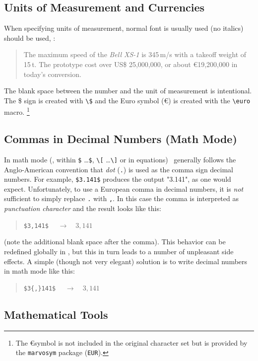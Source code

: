 \subsection{Units of Measurement and Currencies}

When specifying units of measurement, normal font is usually used (no italics) 
should be used, \eg:
%
\begin{quote}
	The maximum speed of the \textit{Bell XS-1} is 345\,m/s with a takeoff weight 
	of 15\,t. The prototype cost over US\$ 25,000,000, or about \euro 19,200,000
	in today's conversion.
\end{quote}
%
The blank space between the number and the unit of measurement is intentional.
The \$ sign is created with \verb!\$! and the Euro symbol (\euro) is created
with the \verb!\euro! macro.%
\footnote{The \euro symbol is not included in the original \latex character 
set but is provided by the \texttt{marvosym} package (\texttt{{\bs}EUR}).}


\subsection{Commas in Decimal Numbers (Math Mode)}


In math mode (\ie, within \verb!$! \ldots \verb!$!, \verb!\[! \ldots \verb!\]! or 
in equations) \latex\ generally follows the Anglo-American convention that 
\emph{dot} (\verb!.!) is used as the comma sign decimal numbers.
For example, \verb!$3.141$! produces the output "3.141", as one would expect.
Unfortunately, to use a European comma in decimal numbers, it is \emph{not}
sufficient to simply replace \verb!.! with \verb!,!.
In this case the comma is interpreted as \emph{punctuation character} and 
the result looks like this:
%
\begin{quote}
	\verb!$3,141$! $\quad \rightarrow \quad 3,141$
\end{quote}
%
(note the additional blank space after the comma). This behavior can be
redefined globally in \latex, but this in turn leads to a number of unpleasant
side effects. A simple (though not very elegant) solution is to write decimal
numbers in math mode like this:
%
\begin{quote}
	\verb!$3{,}141$! $\quad \rightarrow \quad 3{,}141$
\end{quote}


\subsection{Mathematical Tools}

